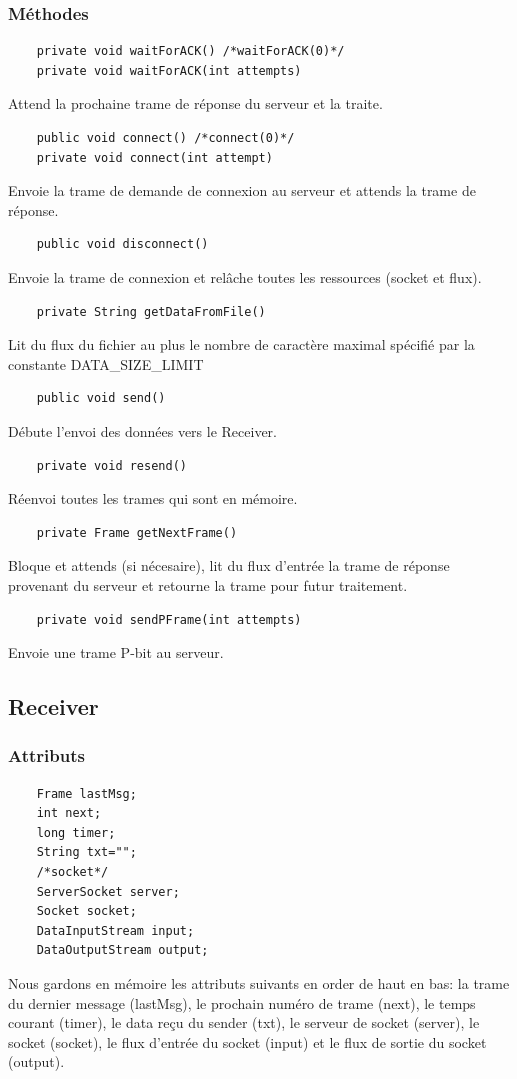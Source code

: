 \documentclass[a4paper,12pt]{article}
\begin{document}
\begin{spacing}{1}
	\subsubsection*{Méthodes}
	\begin{lstlisting}
	private void waitForACK() /*waitForACK(0)*/
	private void waitForACK(int attempts) 
	\end{lstlisting}
	Attend la prochaine trame de réponse du serveur et la traite.
	\begin{lstlisting}
	public void connect() /*connect(0)*/
	private void connect(int attempt)
	\end{lstlisting}
	Envoie la trame de demande de connexion au serveur et attends la trame de réponse.
	\begin{lstlisting}
	public void disconnect()
	\end{lstlisting}
	Envoie la trame de connexion et relâche toutes les ressources (socket et flux).
	\begin{lstlisting}
	private String getDataFromFile()
	\end{lstlisting}
	Lit du flux du fichier au plus le nombre de caractère maximal spécifié par la constante DATA\_SIZE\_LIMIT
	\begin{lstlisting}
	public void send()
	\end{lstlisting}
	Débute l'envoi des données vers le Receiver.
	\begin{lstlisting}
	private void resend()
	\end{lstlisting}
	Réenvoi toutes les trames qui sont en mémoire.
	\begin{lstlisting}
	private Frame getNextFrame()
	\end{lstlisting}
	Bloque et attends (si nécesaire), lit du flux d'entrée la trame de réponse provenant du serveur et retourne la trame pour futur traitement.
	\begin{lstlisting}
	private void sendPFrame(int attempts)
	\end{lstlisting}
	Envoie une trame P-bit au serveur.
	\subsection*{Receiver}
	\subsubsection*{Attributs}
	\begin{lstlisting}
	Frame lastMsg;
	int next;
	long timer;
	String txt="";
	/*socket*/
	ServerSocket server;
	Socket socket;
	DataInputStream input;
	DataOutputStream output;
	\end{lstlisting}
	Nous gardons en mémoire les attributs suivants en order de haut en bas: la trame du dernier message (lastMsg), le prochain numéro de trame (next), le temps courant (timer), le data reçu du sender (txt), le serveur de socket (server), le socket (socket), le flux d'entrée du socket (input) et le flux de sortie du socket (output).

\end{spacing}
\end{document}
